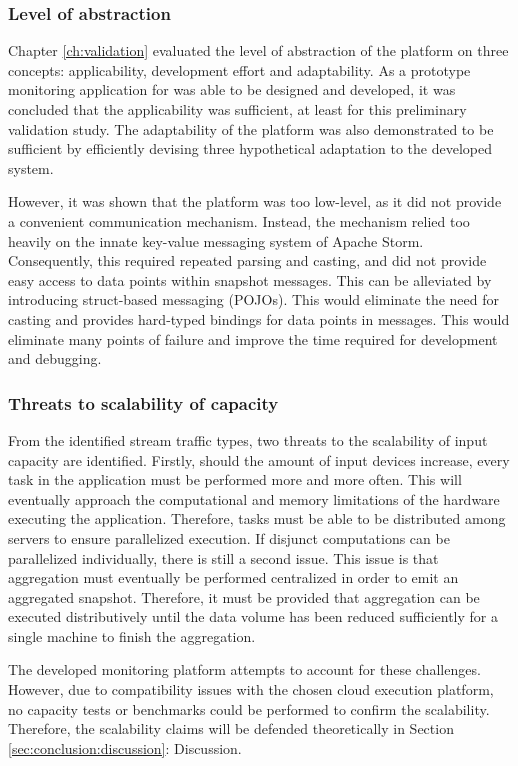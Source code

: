 \subsubsection{Level of abstraction}
Chapter \ref{ch:validation} evaluated the level of abstraction of the platform on three concepts: applicability, development effort and adaptability. As a prototype monitoring application for \nedapidsystems was able to be designed and developed, it was concluded that the applicability was sufficient, at least for this preliminary validation study. The adaptability of the platform was also demonstrated to be sufficient by efficiently devising three hypothetical adaptation to the developed system.

However, it was shown that the platform was too low-level, as it did not provide a convenient communication mechanism. Instead, the mechanism relied too heavily on the innate key-value messaging system of Apache Storm. Consequently, this required repeated parsing and casting, and did not provide easy access to data points within snapshot messages. This can be alleviated by introducing struct-based messaging (POJOs). This would eliminate the need for casting and provides hard-typed bindings for data points in messages. This would eliminate many points of failure and improve the time required for development and debugging.

\subsubsection{Threats to scalability of capacity}
From the identified stream traffic types, two threats to the scalability of input capacity are identified. Firstly, should the amount of input devices increase, every task in the application must be performed more and more often. This will eventually approach the computational and memory limitations of the hardware executing the application. Therefore, tasks must be able to be distributed among servers to ensure parallelized execution. If disjunct computations can be parallelized individually, there is still a second issue. This issue is that aggregation must eventually be performed centralized in order to emit an aggregated snapshot. Therefore, it must be provided that aggregation can be executed distributively until the data volume has been reduced sufficiently for a single machine to finish the aggregation.

The developed monitoring platform attempts to account for these challenges. However, due to compatibility issues with the chosen cloud execution platform, no capacity tests or benchmarks could be performed to confirm the scalability. Therefore, the scalability claims will be defended theoretically in Section \ref{sec:conclusion:discussion}: Discussion.


